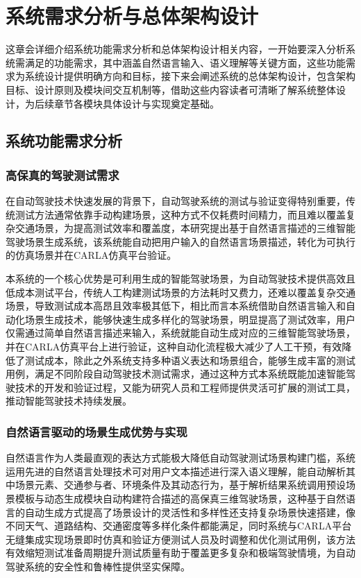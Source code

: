 \chapter{系统需求分析与总体架构设计}
这章会详细介绍系统功能需求分析和总体架构设计相关内容，一开始要深入分析系统需满足的功能需求，其中涵盖自然语言输入、语义理解等关键方面，这些功能需求为系统设计提供明确方向和目标，接下来会阐述系统的总体架构设计，包含架构目标、设计原则及模块间交互机制等，借助这些内容读者可清晰了解系统整体设计，为后续章节各模块具体设计与实现奠定基础。
\section{系统功能需求分析}
\subsection{高保真的驾驶测试需求}
在自动驾驶技术快速发展的背景下，自动驾驶系统的测试与验证变得特别重要，传统测试方法通常依靠手动构建场景，这种方式不仅耗费时间精力，而且难以覆盖复杂交通场景，为提高测试效率和覆盖度，本研究提出基于自然语言描述的三维智能驾驶场景生成系统，该系统能自动把用户输入的自然语言场景描述，转化为可执行的仿真场景并在CARLA仿真平台验证。

本系统的一个核心优势是可利用生成的智能驾驶场景，为自动驾驶技术提供高效且低成本测试平台，传统人工构建测试场景的方法耗时又费力，还难以覆盖复杂交通场景，导致测试成本高昂且效率极其低下，相比而言本系统借助自然语言输入和自动化场景生成技术，能够快速生成多样化的驾驶场景，明显提高了测试效率，用户仅需通过简单自然语言描述来输入，系统就能自动生成对应的三维智能驾驶场景，并在CARLA仿真平台上进行验证，这种自动化流程极大减少了人工干预，有效降低了测试成本，除此之外系统支持多种语义表达和场景组合，能够生成丰富的测试用例，满足不同阶段自动驾驶技术测试需求，通过这种方式本系统既能加速智能驾驶技术的开发和验证过程，又能为研究人员和工程师提供灵活可扩展的测试工具，推动智能驾驶技术持续发展。
\subsection{自然语言驱动的场景生成优势与实现}

自然语言作为人类最直观的表达方式能极大降低自动驾驶测试场景构建门槛，系统运用先进的自然语言处理技术可对用户文本描述进行深入语义理解，能自动解析其中场景元素、交通参与者、环境条件及其动态行为，基于解析结果系统调用预设场景模板与动态生成模块自动构建符合描述的高保真三维驾驶场景，这种基于自然语言的自动生成方式提高了场景设计的灵活性和多样性还支持复杂场景快速搭建，像不同天气、道路结构、交通密度等多样化条件都能满足，同时系统与CARLA平台无缝集成实现场景即时仿真和验证方便测试人员及时调整和优化测试用例，该方法有效缩短测试准备周期提升测试质量有助于覆盖更多复杂和极端驾驶情境，为自动驾驶系统的安全性和鲁棒性提供坚实保障。

